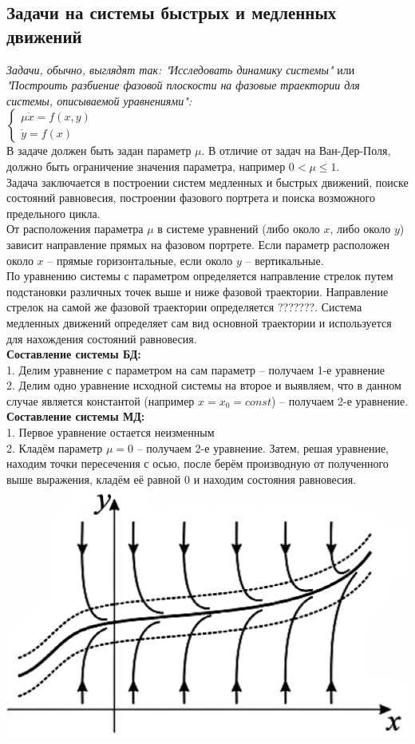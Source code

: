 \begin{multicols*}{2}
		\section{Задачи на системы быстрых и медленных движений}
		\textit{Задачи, обычно, выглядят так: "Исследовать динамику системы"} или \textit{"Построить разбиение фазовой плоскости на фазовые траектории для системы, описываемой уравнениями":\\
		$\begin{cases}
			\mu\dot{x} = f(x, y)\\
			\dot{y} = f(x)
		\end{cases}$}\\
		В задаче должен быть задан параметр $\mu$. В отличие от задач на Ван-Дер-Поля, должно быть ограничение значения параметра, например $0 < \mu \leqslant 1$.\\
		Задача заключается в построении систем медленных и быстрых движений, поиске состояний равновесия, построении фазового портрета и поиска возможного предельного цикла.  \\
		От расположения параметра $\mu$ в системе уравнений (либо около $x$, либо около $y$) зависит направление прямых на фазовом портрете. Если параметр расположен около $x$ – прямые горизонтальные, если около $y$ – вертикальные.\\ 
		По уравнению системы с параметром определяется направление стрелок путем подстановки различных точек выше и ниже фазовой траектории. Направление стрелок на самой же фазовой траектории определяется ???????. Система медленных движений определяет сам вид основной траектории и используется для нахождения состояний равновесия.\\ 
		\textbf{Составление системы БД:}\\
		1. Делим уравнение с параметром на сам параметр – получаем 1-е уравнение\\
		2. Делим одно уравнение исходной системы на второе и выявляем, что в данном случае является константой (например $x = x_0 = const$) – получаем 2-е уравнение.\\
		\textbf{Составление системы МД:}\\
		1. Первое уравнение остается неизменным\\
		2. Кладём параметр $\mu = 0$ – получаем 2-е уравнение. Затем, решая уравнение, находим точки пересечения с осью, после берём производную от полученного выше выражения, кладём её равной 0 и находим состояния равновесия.\\
		\includegraphics[width=0.5\linewidth]{tk_practice_img/sbmd_2}

\end{multicols*}
